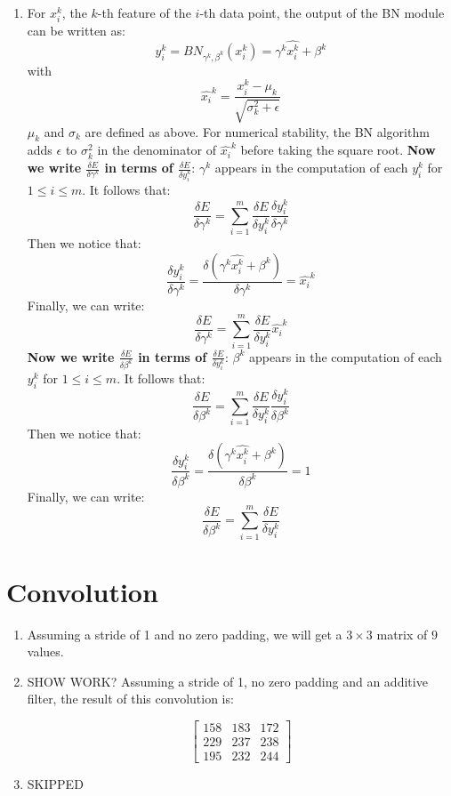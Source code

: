 \documentclass[a4paper]{article}
\begin{document}
\begin{enumerate}
\item{ For $x_i^k$, the $k$-th feature of the $i$-th data point, the output of the BN module can be written as:
$$y_i^k = BN_{\gamma^k,\beta^k}(x_i^k) = \gamma^k \hat{x_i^k} + \beta^k $$
with
$$\hat{x_i}^k = \frac{x_i^k - \mu_k}{\sqrt{\sigma_k^2 + \epsilon}}$$
$\mu_k$ and $\sigma_k$ are defined as above. For numerical stability, the BN algorithm adds $\epsilon$ to $\sigma_k^2$ in the denominator of $\hat{x_i}^k$ before taking the square root.
\newline
\newline
\textbf{Now we write $\frac{\delta E}{\delta \gamma^k}$ in terms of $\frac{\delta E}{\delta y_i^k}$}:
\newline
\newline
$\gamma^k$ appears in the computation of each $y_i^k$ for $1 \leq i \leq m$. It follows that:
$$\frac{\delta E}{\delta \gamma^k} = \sum_{i=1}^m \frac{\delta E}{\delta y_i^k} \frac{\delta y_i^k}{\delta \gamma^k} $$
Then we notice that:
$$ \frac{\delta y_i^k}{\delta \gamma^k} =  \frac{\delta ( \gamma^k \hat{x_i^k} + \beta^k )}{\delta \gamma^k} = \hat{x_i}^k$$
Finally, we can write:
$$\frac{\delta E}{\delta \gamma^k} = \sum_{i=1}^m \frac{\delta E}{\delta y_i^k} \hat{x_i}^k $$
\newline
\newline
\textbf{Now we write $\frac{\delta E}{\delta \beta^k}$ in terms of $\frac{\delta E}{\delta y_i^k}$}:
\newline
\newline
$\beta^k$ appears in the computation of each $y_i^k$ for $1 \leq i \leq m$. It follows that:
$$\frac{\delta E}{\delta \beta^k} = \sum_{i=1}^m \frac{\delta E}{\delta y_i^k} \frac{\delta y_i^k}{\delta \beta^k} $$
Then we notice that:
$$ \frac{\delta y_i^k}{\delta \beta^k} =  \frac{\delta ( \gamma^k \hat{x_i^k} + \beta^k )}{\delta \beta^k} = 1$$
Finally, we can write:
$$\frac{\delta E}{\delta \beta^k} = \sum_{i=1}^m \frac{\delta E}{\delta y_i^k} $$

}


\end{enumerate}

\section{Convolution}

\begin{enumerate}
\item{Assuming a stride of 1 and no zero padding, we will get a $3 \times 3$ matrix of $9$ values.}
\item{SHOW WORK?
\newline
\newline
Assuming a stride of 1, no zero padding and an additive filter, the result of this convolution is:

$$
\begin{bmatrix}
158 & 183 & 172 \\
229 & 237 & 238 \\
195 & 232 & 244 
\end{bmatrix}
$$

 }
\item{SKIPPED}
\end{enumerate}
\end{document}
